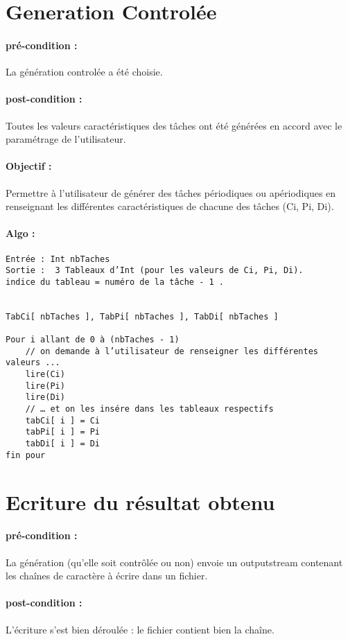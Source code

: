 \section{Generation Controlée}  
\paragraph{pré-condition :} La génération controlée a été choisie.
\paragraph{post-condition :} Toutes les valeurs caractéristiques des tâches ont été générées en accord avec le paramétrage de l’utilisateur.
\paragraph{Objectif :} Permettre à l’utilisateur de générer des tâches périodiques ou apériodiques en renseignant les différentes caractéristiques de chacune des tâches (Ci, Pi, Di).
\paragraph{Algo :} 
\begin{verbatim}
Entrée : Int nbTaches
Sortie :  3 Tableaux d’Int (pour les valeurs de Ci, Pi, Di). 
indice du tableau = numéro de la tâche - 1 .


TabCi[ nbTaches ], TabPi[ nbTaches ], TabDi[ nbTaches ]
        
Pour i allant de 0 à (nbTaches - 1)
    // on demande à l’utilisateur de renseigner les différentes valeurs ...
    lire(Ci)
    lire(Pi)
    lire(Di)        
    // … et on les insére dans les tableaux respectifs
    tabCi[ i ] = Ci
    tabPi[ i ] = Pi
    tabDi[ i ] = Di
fin pour
\end{verbatim}

\section{Ecriture du résultat obtenu}
    \paragraph{pré-condition :} La génération (qu'elle soit contrôlée ou non) envoie un outputstream contenant les chaînes de caractère à écrire dans un fichier.
    \paragraph{post-condition :} L'écriture s'est bien déroulée : le fichier contient bien la chaîne.
